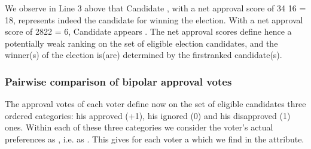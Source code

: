 \documentclass[a4paper,12pt,english]{sphinxhowto}
\begin{document}
\sphinxAtStartPar
We observe in Line 3 above that Candidate , with a net approval score of 34 \sphinxhyphen{} 16 = 18, represents indeed the  candidate for winning the election. With a net approval score of 28\sphinxhyphen{}22 = 6, Candidate  appears . The net approval scores define hence a potentially weak ranking on the set of eligible election candidates, and the winner(s) of the election is(are) determined by the first\sphinxhyphen{}ranked candidate(s).


\subsubsection{Pairwise comparison of bipolar approval votes}
\label{\detokenize{pearls:pairwise-comparison-of-bipolar-approval-votes}}
\sphinxAtStartPar
The approval votes of each voter define now on the set of eligible candidates three ordered categories: his approved (+1), his ignored (0) and his disapproved (\sphinxhyphen{}1) ones. Within each of these three categories we consider the voter’s actual preferences as , i.e. as . This gives for each voter a  which we find in the  attribute.

\begin{sphinxVerbatim}[commandchars=\\\{\},numbers=left,firstnumber=1,stepnumber=1]
\PYG{p}{[}\PYG{p}{]}\PYG{p}{[}\PYG{p}{]}
\end{sphinxVerbatim}
\end{document}
